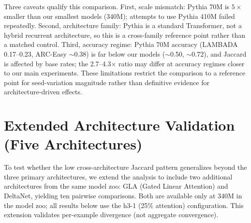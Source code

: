 Three caveats qualify this comparison. First, scale mismatch: Pythia 70M is $5\times$ smaller than our smallest models (340M); attempts to use Pythia 410M failed repeatedly. Second, architecture family: Pythia is a standard Transformer, not a hybrid recurrent architecture, so this is a cross-family reference point rather than a matched control. Third, accuracy regime: Pythia 70M accuracy (LAMBADA 0.17--0.23, ARC-Easy ${\sim}$0.38) is far below our models (${\sim}$0.50, ${\sim}$0.72), and Jaccard is affected by base rates; the 2.7--4.3$\times$ ratio may differ at accuracy regimes closer to our main experiments. These limitations restrict the comparison to a reference point for seed-variation magnitude rather than definitive evidence for architecture-driven effects.

\section{Extended Architecture Validation (Five Architectures)}\label{app:extended_arch}

To test whether the low cross-architecture Jaccard pattern generalizes beyond the three primary architectures, we extend the analysis to include two additional architectures from the same model zoo: GLA (Gated Linear Attention) and DeltaNet, yielding ten pairwise comparisons. Both are available only at 340M in the model zoo; all results below use the h3-1 (25\% attention) configuration. This extension validates per-example divergence (not aggregate convergence).

